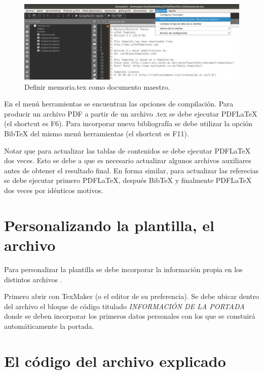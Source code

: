 \begin{figure}[h]
	\centering
	\includegraphics[width=\textwidth]{./Figures/docMaestro.png}
	\caption{Definir memoria.tex como documento maestro.}
	\label{fig:docMaestro}
\end{figure}

En el menú herramientas se encuentran las opciones de compilación.  Para producir un archivo PDF a partir de un archivo .tex se debe ejecutar PDFLaTeX (el shortcut es F6). Para incorporar nueva bibliografía se debe utilizar la opción BibTeX del mismo menú herramientas (el shortcut es F11).

Notar que para actualizar las tablas de contenidos se debe ejecutar PDFLaTeX dos veces.  Esto se debe a que es necesario actualizar algunos archivos auxiliares antes de obtener el resultado final.  En forma similar, para actualizar las referecias se debe ejecutar primero PDFLaTeX, después BibTeX y finalmente PDFLaTeX dos veces por idénticos motivos.

\section{Personalizando la plantilla, el archivo }
\label{sec:FillingFile}

Para personalizar la plantilla se debe incorporar la información propia en los distintos archivos . 

Primero abrir  con TexMaker (o el editor de su preferencia). Se debe ubicar dentro del archivo el bloque de código titulado \emph{INFORMACIÓN DE LA PORTADA} donde se deben incorporar los primeros datos personales con los que se constuirá automáticamente la portada.



\section{El código del archivo  explicado}

